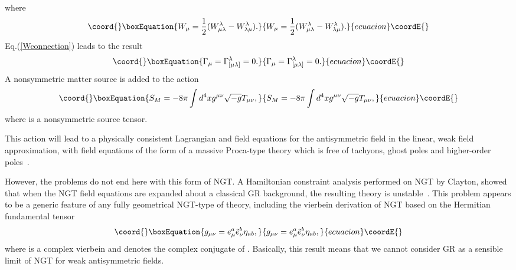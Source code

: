 \documentclass[a4paper,10pt]{article}
\begin{document}
where
\begin{equation}\coord{}\boxEquation{
W_\mu=\frac{1}{2}(W^\lambda_{\mu\lambda}-W^\lambda_{\lambda\mu}).
}{
W_\mu=\frac{1}{2}(W^\lambda_{\mu\lambda}-W^\lambda_{\lambda\mu}).
}{ecuacion}\coordE{}\end{equation}
Eq.(\ref{Wconnection}) leads to the result
\begin{equation}\coord{}\boxEquation{
\Gamma_\mu=\Gamma^\lambda_{[\mu\lambda]}=0.
}{
\Gamma_\mu=\Gamma^\lambda_{[\mu\lambda]}=0.
}{ecuacion}\coordE{}\end{equation}
A nonsymmetric matter source is added to the action
\begin{equation}\coord{}\boxEquation{
S_M=-8\pi\int d^4xg^{\mu\nu}\sqrt{-g}T_{\mu\nu},
}{
S_M=-8\pi\int d^4xg^{\mu\nu}\sqrt{-g}T_{\mu\nu},
}{ecuacion}\coordE{}\end{equation}
where \coordHE{} is a nonsymmetric source tensor.

This action will lead to a physically consistent Lagrangian and field
equations for the antisymmetric field in the linear, weak field
approximation, with field equations of the form of a massive Proca-type
theory which is free of tachyons, ghost poles and higher-order
poles~\cite{Moffat8,Moffat9}.

However, the problems do not end here with this form of NGT. A Hamiltonian
constraint analysis performed on NGT by Clayton, showed that when the NGT field
equations are expanded about a classical GR background, the resulting theory is
unstable~\cite{Clayton,Clayton2}. This problem appears to be a generic
feature of any fully geometrical NGT-type of theory, including the vierbein
derivation of NGT based on the Hermitian fundamental
tensor~\cite{Moffat6,Moffat7,Chamseddine}
\begin{equation}\coord{}\boxEquation{
g_{\mu\nu}=e^a_\mu {\tilde e}^{b}_\nu\eta_{ab},
}{
g_{\mu\nu}=e^a_\mu {\tilde e}^{b}_\nu\eta_{ab},
}{ecuacion}\coordE{}\end{equation}
where \coordHE{} is a complex vierbein and \coordHE{} denotes the 
complex conjugate of \coordHE{}. Basically, this result means that we cannot
consider GR as a sensible limit of NGT for weak antisymmetric fields.
\end{document}
